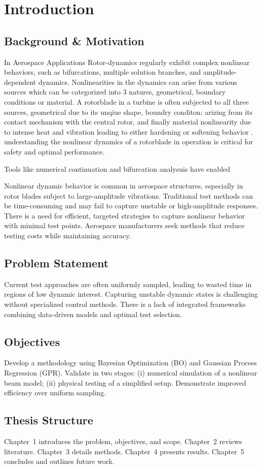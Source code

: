 \chapter{Introduction}

\section{Background \& Motivation}
In Aerospace Applications Rotor-dynamics regularly exhibit complex nonlinear behaviors, such as bifurcations, multiple solution branches, and amplitude-dependent dynamics. Nonlinearities in the dynamics can arise from various sources which can be categorized into 3 natures, geometrical, boundary conditions or material. A rotorblade in a turbine is often subjected to all three sources, geometrical due to its unqiue shape, boundry conditon: arizing from its contact mechanism with the central rotor, and finally material nonlinearity due to intense heat and vibration leading to either hardening or softening behavior
\cite{akayContinuationAnalysisNonlinear2021a, chipatoEffectGravityinducedAsymmetry2018, varneyNonlinearPhenomenaBifurcations2015}. understanding the nonlinear dynamics of a rotorblade in operation is critical for safety and optimal performance.

Tools like numerical continuation and bifurcation analysuis have enabled 
\cite{PDFNonlinearDynamics2025}

Nonlinear dynamic behavior is common in aerospace structures, especially in rotor blades subject to large-amplitude vibrations.
Traditional test methods can be time-consuming and may fail to capture unstable or high-amplitude responses.
There is a need for efficient, targeted strategies to capture nonlinear behavior with minimal test points.
Aerospace manufacturers seek methods that reduce testing costs while maintaining accuracy.

\section{Problem Statement}
Current test approaches are often uniformly sampled, leading to wasted time in regions of low dynamic interest.
Capturing unstable dynamic states is challenging without specialized control methods.
There is a lack of integrated frameworks combining data-driven models and optimal test selection.

\section{Objectives}
Develop a methodology using Bayesian Optimization (BO) and Gaussian Process Regression (GPR).
Validate in two stages: (i) numerical simulation of a nonlinear beam model; (ii) physical testing of a simplified setup.
Demonstrate improved efficiency over uniform sampling.

\section{Thesis Structure}
Chapter~1 introduces the problem, objectives, and scope.
Chapter~2 reviews literature.
Chapter~3 details methods.
Chapter~4 presents results.
Chapter~5 concludes and outlines future work.
